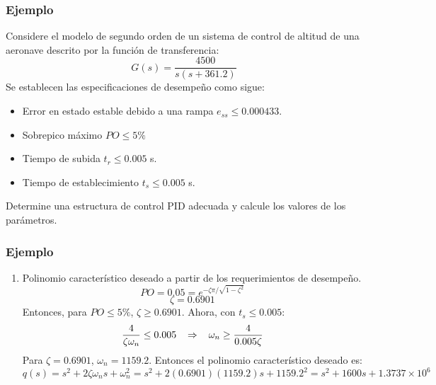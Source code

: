 \documentclass[aspectratio=169]{beamer}
\theoremstyle{definition}
\theoremstyle{plain}
\theoremstyle{remark}
\newcounter{saveenumi}
\newcommand{\seti}{\setcounter{saveenumi}{\value{enumi}}}
\begin{document}
\begin{frame}[c]\frametitle{Ejemplo}
Considere el modelo de segundo orden de un sistema de control de altitud de una aeronave descrito por la función de transferencia:
\begin{equation*}
	G(s) = \frac{4500}{s(s+361.2)}
\end{equation*}
Se establecen las especificaciones de desempeño como sigue:
\begin{itemize}
	\item Error en estado estable debido a una rampa $e_{ss} \leq 0.000433$.
	\item Sobrepico máximo $PO \leq 5\%$
	\item Tiempo de subida $t_r \leq 0.005$ s.
	\item Tiempo de establecimiento $t_s \leq 0.005$ s.
\end{itemize}
Determine una estructura de control PID adecuada y calcule los valores de los parámetros.
\end{frame}

\begin{frame}[<+->]\frametitle{Ejemplo}
\begin{enumerate}
	\item Polinomio característico deseado a partir de los requerimientos de desempeño.
	\begin{equation*}
		PO = 0.05 = e^{-\zeta \pi / \sqrt{1-\zeta^2}}
	\end{equation*}
	\begin{equation*}
		\zeta = 0.6901
	\end{equation*}
	Entonces, para $PO \leq 5\%$, $\zeta \geq 0.6901$. Ahora, con $t_s \leq 0.005$:
	\begin{equation*}
		\frac{4}{\zeta \omega_n} \leq 0.005 \hspace*{3mm} \Rightarrow \hspace*{3mm} \omega_n \geq \frac{4}{0.005\zeta}
	\end{equation*}
	Para $\zeta = 0.6901$, $\omega_n = 1159.2$. Entonces el polinomio característico deseado es:
	\begin{equation*}
		q(s) = s^2 + 2 \zeta \omega_n s + \omega_n^2 = s^2 + 2(0.6901)(1159.2)s + 1159.2^2 = s^2 + 1600s +1.3737\times 10^6
	\end{equation*}
	\seti
\end{enumerate}
\end{frame}
\end{document}
